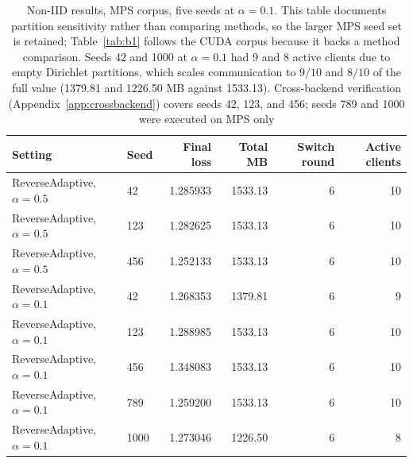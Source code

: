 \begin{table}[tbp]
\centering
\footnotesize
\setlength{\tabcolsep}{6pt}
\caption{Non-IID results, MPS corpus, five seeds at $\alpha{=}0.1$. This table documents partition sensitivity rather than comparing methods, so the larger MPS seed set is retained; Table~\ref{tab:b1} follows the CUDA corpus because it backs a method comparison. Seeds 42 and 1000 at $\alpha{=}0.1$ had 9 and 8 active clients due to empty Dirichlet partitions, which scales communication to $9/10$ and $8/10$ of the full value (1379.81 and 1226.50 MB against 1533.13). Cross-backend verification (Appendix~\ref{app:crossbackend}) covers seeds 42, 123, and 456; seeds 789 and 1000 were executed on MPS only}
\label{tab:b2}
\begin{tabular}{@{}llrrrr@{}}
\toprule
Setting & Seed & Final loss & Total MB & Switch round & Active clients \\
\midrule
ReverseAdaptive, $\alpha{=}0.5$ & 42 & 1.285933 & 1533.13 & 6 & 10 \\
ReverseAdaptive, $\alpha{=}0.5$ & 123 & 1.282625 & 1533.13 & 6 & 10 \\
ReverseAdaptive, $\alpha{=}0.5$ & 456 & 1.252133 & 1533.13 & 6 & 10 \\
ReverseAdaptive, $\alpha{=}0.1$ & 42 & 1.268353 & 1379.81 & 6 & 9 \\
ReverseAdaptive, $\alpha{=}0.1$ & 123 & 1.288985 & 1533.13 & 6 & 10 \\
ReverseAdaptive, $\alpha{=}0.1$ & 456 & 1.348083 & 1533.13 & 6 & 10 \\
ReverseAdaptive, $\alpha{=}0.1$ & 789 & 1.259200 & 1533.13 & 6 & 10 \\
ReverseAdaptive, $\alpha{=}0.1$ & 1000 & 1.273046 & 1226.50 & 6 & 8 \\
\bottomrule
\end{tabular}
\end{table}

